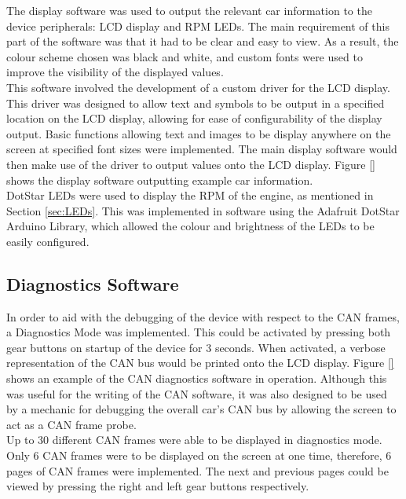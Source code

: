 \documentclass[a4paper,12pt]{article}
\begin{document}
The display software was used to output the relevant car information to the device peripherals: LCD display and RPM LEDs. The main requirement of this part of the software was that it had to be clear and easy to view. As a result, the colour scheme chosen was black and white, and custom fonts were used to improve the visibility of the displayed values. \\

This software involved the development of a custom driver for the LCD display. This driver was designed to allow text and symbols to be output in a specified location on the LCD display, allowing for ease of configurability of the display output. Basic functions allowing text and images to be display anywhere on the screen at specified font sizes were implemented. The main display software would then make use of the driver to output values onto the LCD display. Figure \ref{} shows the display software outputting example car information. \\



DotStar LEDs were used to display the RPM of the engine, as mentioned in Section \ref{sec:LEDs}. This was implemented in software using the Adafruit DotStar Arduino Library, which allowed the colour and brightness of the LEDs to be easily configured.

\subsection{Diagnostics Software}
\label{sec:diagnostics_software}

In order to aid with the debugging of the device with respect to the CAN frames, a Diagnostics Mode was implemented. This could be activated by pressing both gear buttons on startup of the device for 3 seconds. When activated, a verbose representation of the CAN bus would be printed onto the LCD display. Figure \ref{} shows an example of the CAN diagnostics software in operation. Although this was useful for the writing of the CAN software, it was also designed to be used by a mechanic for debugging the overall car’s CAN bus by allowing the screen to act as a CAN frame probe. \\

Up to 30 different CAN frames were able to be displayed in diagnostics mode. Only 6 CAN frames were to be displayed on the screen at one time, therefore, 6 pages of CAN frames were implemented. The next and previous pages could be viewed by pressing the right and left gear buttons respectively.
\end{document}

